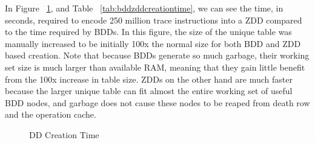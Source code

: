 \documentclass[defaultstyle,11pt]{thesis}
\begin{document}
In Figure ~\ref{fig:zddbddtime}, and Table
~\ref{tab:bddzddcreationtime}, we can see the time, in seconds,
required to encode 250 million trace instructions into a ZDD compared
to the time required by BDDs.  In this figure, the size of the unique
table was manually increased to be initially 100x the normal size for
both BDD and ZDD based creation. Note that because BDDs generate so
much garbage, their working set size is much larger than available
RAM, meaning that they gain little benefit from the 100x increase in
table size.  ZDDs on the other hand are much faster because the larger
unique table can fit almost the entire working set of useful BDD
nodes, and garbage does not cause these nodes to be reaped from death
row and the operation cache.

\begin{figure}
  \centering
  \caption{DD Creation Time}
  \label{fig:zddbddtime}
\end{figure}
\end{document}
